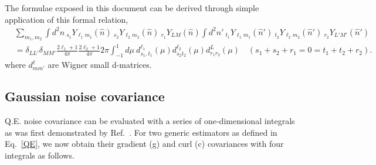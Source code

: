 \documentclass{article}
\newcommand{\hn}[0]{\hat n}
\begin{document}
\newline
\newline
The formulae exposed in this document can be derived through simple application of this formal relation,
\begin{equation}
\begin{split}
&\sum_{m_1,m_2}\int d^2n\:_{s_1} Y_{\ell_1 m_1}(\hn)\:_{s_2} Y_{\ell_2 m_2}(\hn)\:_{r_1} Y_{L M}(\hn)\int d^2n'\:_{t_1} Y_{\ell_1 m_1}(\hn')\:_{t_2} Y_{\ell_2 m_2}(\hn')\:_{r_2} Y_{L' M'}(\hn')  \\&= \delta_{LL'}\delta_{MM'}\frac{2\ell_1 + 1}{4\pi}\frac{2\ell_2 + 1} {4\pi} 2\pi \int_{-1}^{1} d\mu \: d^{\ell_1}_{s_1,t_1}(\mu)d^{\ell_2}_{s_2 t_2}(\mu)d^{L}_{r_1 r_2}(\mu) \quad (s_1 + s_2 + r_1  = 0 = t_1 + t_2 + r_2).
\end{split}
\end{equation}
where $d^\ell_{mm'}$ are Wigner small d-matrices.
\subsection{Gaussian noise covariance}
Q.E. noise covariance can be evaluated with a series of one-dimensional integrals as was first demonstrated by Ref.~\cite{}. For two generic estimators as defined in Eq.~\eqref{QE}, we now obtain their gradient (g) and curl (c) covariances with four integrals as follows.
\end{document}
